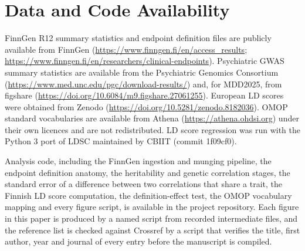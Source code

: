\documentclass[conference]{IEEEtran}
\begin{document}
\section*{Data and Code Availability}
FinnGen R12 summary statistics and endpoint definition files are publicly available from FinnGen (\url{https://www.finngen.fi/en/access_results}; \url{https://www.finngen.fi/en/researchers/clinical-endpoints}). Psychiatric GWAS summary statistics are available from the Psychiatric Genomics Consortium (\url{https://www.med.unc.edu/pgc/download-results/}) and, for MDD2025, from figshare (\url{https://doi.org/10.6084/m9.figshare.27061255}). European LD scores were obtained from Zenodo (\url{https://doi.org/10.5281/zenodo.8182036}). OMOP standard vocabularies are available from Athena (\url{https://athena.ohdsi.org}) under their own licences and are not redistributed. LD score regression was run with the Python 3 port of LDSC maintained by CBIIT (commit 1f09cf0).

Analysis code, including the FinnGen ingestion and munging pipeline, the endpoint definition anatomy, the heritability and genetic correlation stages, the standard error of a difference between two correlations that share a trait, the Finnish LD score computation, the definition-effect test, the OMOP vocabulary mapping and every figure script, is available in the project repository. Each figure in this paper is produced by a named script from recorded intermediate files, and the reference list is checked against Crossref by a script that verifies the title, first author, year and journal of every entry before the manuscript is compiled.

\clearpage


\end{document}
